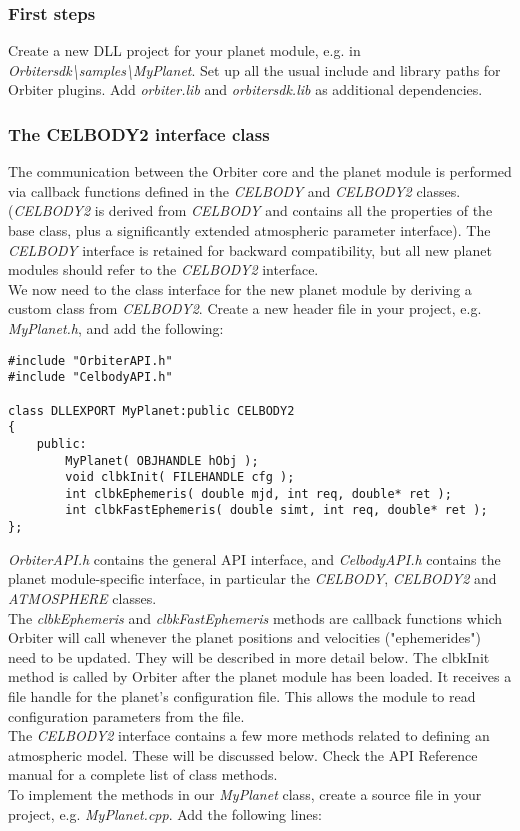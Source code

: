 \documentclass[Orbiter Developer Manual.tex]{subfiles}
\begin{document}
\subsubsection{First steps}
Create a new DLL project for your planet module, e.g. in \textit{Orbitersdk\textbackslash samples\textbackslash MyPlanet}. Set up all the usual include and library paths for Orbiter plugins. Add \textit{orbiter.lib} and \textit{orbitersdk.lib} as additional dependencies.

\subsubsection{The CELBODY2 interface class}
The communication between the Orbiter core and the planet module is performed via callback functions defined in the \textit{CELBODY} and \textit{CELBODY2} classes. (\textit{CELBODY2} is derived from \textit{CELBODY} and contains all the properties of the base class, plus a significantly extended atmospheric parameter interface). The \textit{CELBODY} interface is retained for backward compatibility, but all new planet modules should refer to the \textit{CELBODY2} interface.\\
We now need to the class interface for the new planet module by deriving a custom class from \textit{CELBODY2}. Create a new header file in your project, e.g. \textit{MyPlanet.h}, and add the following:

\begin{lstlisting}
#include "OrbiterAPI.h"
#include "CelbodyAPI.h"

class DLLEXPORT MyPlanet:public CELBODY2
{
	public:
		MyPlanet( OBJHANDLE hObj );
		void clbkInit( FILEHANDLE cfg );
		int clbkEphemeris( double mjd, int req, double* ret );
		int clbkFastEphemeris( double simt, int req, double* ret );
};
\end{lstlisting}

\noindent
\textit{OrbiterAPI.h} contains the general API interface, and \textit{CelbodyAPI.h} contains the planet module-specific interface, in particular the \textit{CELBODY}, \textit{CELBODY2} and \textit{ATMOSPHERE} classes.\\
The \textit{clbkEphemeris} and \textit{clbkFastEphemeris} methods are callback functions which Orbiter will call whenever the planet positions and velocities ("ephemerides") need to be updated. They will be described in more detail below. The clbkInit method is called by Orbiter after the planet module has been loaded. It receives a file handle for the planet's configuration file. This allows the module to read configuration parameters from the file.\\
The \textit{CELBODY2} interface contains a few more methods related to defining an atmospheric model. These will be discussed below. Check the API Reference manual for a complete list of class methods.\\
To implement the methods in our \textit{MyPlanet} class, create a source file in your project, e.g. \textit{MyPlanet.cpp}. Add the following lines:
\end{document}
